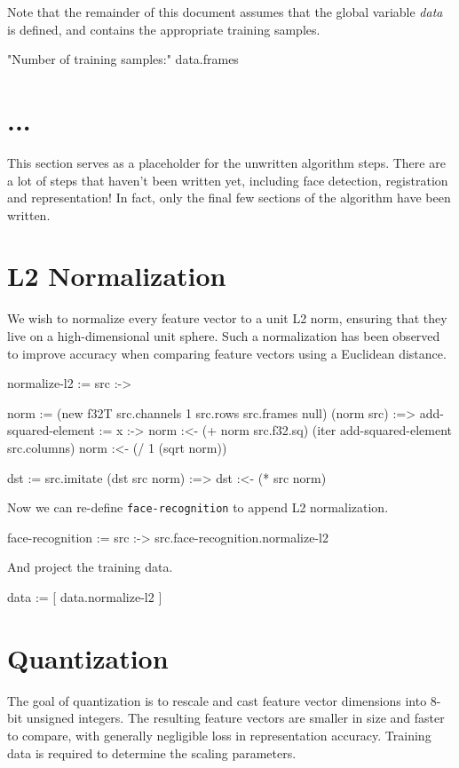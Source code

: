 \documentclass{article}
\begin{document}
Note that the remainder of this document assumes that the global variable \emph{data} is defined, and contains the appropriate training samples.

\begin{likely}
"Number of training samples:"
data.frames
\end{likely}

\section{...}
This section serves as a placeholder for the unwritten algorithm steps.
There are a lot of steps that haven't been written yet, including face detection, registration and representation!
In fact, only the final few sections of the algorithm have been written.

\section{L2 Normalization}
We wish to normalize every feature vector to a unit L2 norm, ensuring that they live on a high-dimensional unit sphere.
Such a normalization has been observed to improve accuracy when comparing feature vectors using a Euclidean distance.

\begin{likely}
normalize-l2 :=
  src :->
  {
    norm := (new f32T src.channels 1 src.rows src.frames null)
    (norm src) :=>
    {
      add-squared-element :=
        x :->
          norm :<- (+ norm src.f32.sq)
      (iter add-squared-element src.columns)
      norm :<- (/ 1 (sqrt norm))
    }

    dst := src.imitate
    (dst src norm) :=>
      dst :<- (* src norm)
  }
\end{likely}

Now we can re-define \texttt{face-recognition} to append L2 normalization.

\begin{likely}
face-recognition :=
  src :->
    src.face-recognition.normalize-l2
\end{likely}

And project the training data.

\begin{likely}
data := [ data.normalize-l2 ]
\end{likely}

\section{Quantization}
The goal of quantization is to rescale and cast feature vector dimensions into 8-bit unsigned integers.
The resulting feature vectors are smaller in size and faster to compare, with generally negligible loss in representation accuracy.
Training data is required to determine the scaling parameters.
\end{document}
